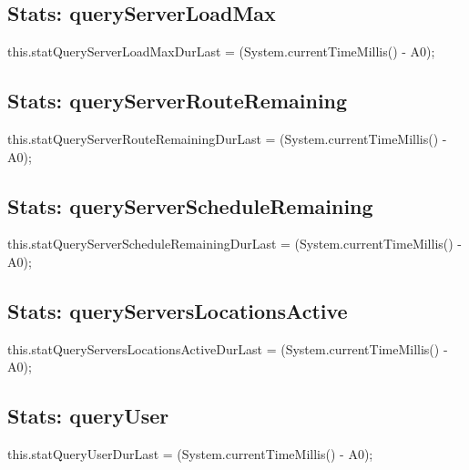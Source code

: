 \subsection{Stats: queryServerLoadMax}
\nwenddocs{}\endmoddef{}
this.statQueryServerLoadMaxDurLast = (System.currentTimeMillis() - A0);
\nwendcode{}\nwdocspar

\subsection{Stats: queryServerRouteRemaining}
\nwenddocs{}\endmoddef{}
this.statQueryServerRouteRemainingDurLast = (System.currentTimeMillis() - A0);
\nwendcode{}\nwdocspar

\subsection{Stats: queryServerScheduleRemaining}
\nwenddocs{}\endmoddef{}
this.statQueryServerScheduleRemainingDurLast = (System.currentTimeMillis() - A0);
\nwendcode{}\nwdocspar

\subsection{Stats: queryServersLocationsActive}
\nwenddocs{}\endmoddef{}
this.statQueryServersLocationsActiveDurLast = (System.currentTimeMillis() - A0);
\nwendcode{}\nwdocspar

\subsection{Stats: queryUser}
\nwenddocs{}\endmoddef{}
this.statQueryUserDurLast = (System.currentTimeMillis() - A0);
\nwendcode{}\nwdocspar


